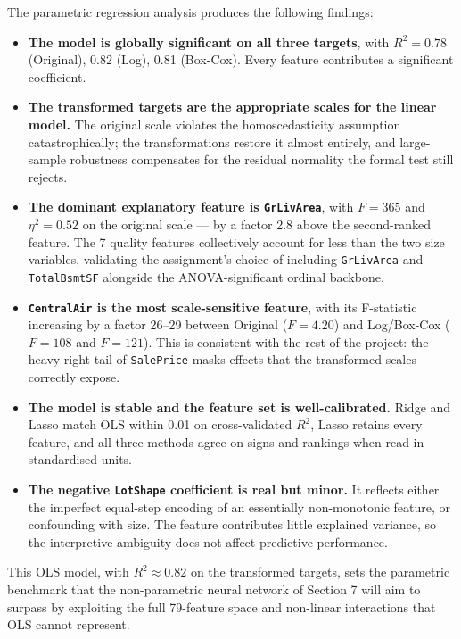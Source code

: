 The parametric regression analysis produces the following findings:

\begin{itemize}
\tightlist
\item
  \textbf{The model is globally significant on all three targets}, with
  \(R^2 = 0.78\) (Original), 0.82 (Log), 0.81 (Box-Cox). Every feature
  contributes a significant coefficient.
\item
  \textbf{The transformed targets are the appropriate scales for the
  linear model.} The original scale violates the homoscedasticity
  assumption catastrophically; the transformations restore it almost
  entirely, and large-sample robustness compensates for the residual
  normality the formal test still rejects.
\item
  \textbf{The dominant explanatory feature is \texttt{GrLivArea}}, with
  \(F = 365\) and \(\eta^2 = 0.52\) on the original scale --- by a
  factor 2.8 above the second-ranked feature. The 7 quality features
  collectively account for less than the two size variables, validating
  the assignment's choice of including \texttt{GrLivArea} and
  \texttt{TotalBsmtSF} alongside the ANOVA-significant ordinal backbone.
\item
  \textbf{\texttt{CentralAir} is the most scale-sensitive feature}, with
  its F-statistic increasing by a factor 26--29 between Original
  (\(F = 4.20\)) and Log/Box-Cox (\(F = 108\) and \(F = 121\)). This is
  consistent with the rest of the project: the heavy right tail of
  \texttt{SalePrice} masks effects that the transformed scales correctly
  expose.
\item
  \textbf{The model is stable and the feature set is well-calibrated.}
  Ridge and Lasso match OLS within 0.01 on cross-validated \(R^2\),
  Lasso retains every feature, and all three methods agree on signs and
  rankings when read in standardised units.
\item
  \textbf{The negative \texttt{LotShape} coefficient is real but minor.}
  It reflects either the imperfect equal-step encoding of an essentially
  non-monotonic feature, or confounding with size. The feature
  contributes little explained variance, so the interpretive ambiguity
  does not affect predictive performance.
\end{itemize}

This OLS model, with \(R^2 \approx 0.82\) on the transformed targets,
sets the parametric benchmark that the non-parametric neural network of
Section 7 will aim to surpass by exploiting the full 79-feature space
and non-linear interactions that OLS cannot represent.

